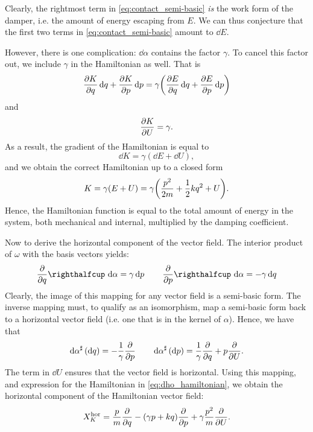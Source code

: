 Clearly, the rightmost term in \cref{eq:contact_semi-basic} \emph{is} the work form of the damper, i.e. the amount of energy escaping from $E$. We can thus conjecture that the first two terms in \cref{eq:contact_semi-basic} amount to $\dd{E}$.

However, there is one complication: $\dd{\alpha}$ contains the factor $\gamma$. To cancel this factor out, we include $\gamma$ in the Hamiltonian as well. That is
$$ 
    \pdv{K}{q}\dd{q} + \pdv{K}{p}\dd{p} = \gamma \qty(\pdv{E}{q}\dd{q} + \pdv{E}{p}\dd{p}) $$
and 
$$ \pdv{K}{U} = \gamma. $$
As a result, the gradient of the Hamiltonian is equal to 
$$ \dd{K} = \gamma (\dd{E} + \dd{U}), $$
and we obtain the correct Hamiltonian up to a closed form
\begin{equation} 
    K = \gamma (E + U) = \gamma\qty( \frac{p^2}{2m} + \frac{1}{2}kq^2 + U). 
    \label{eq:dho_hamiltonian}
\end{equation} 
Hence, the Hamiltonian function is equal to the total amount of energy in the system, both mechanical and internal, multiplied by the damping coefficient.

Now to derive the horizontal component of the vector field. The interior product of $\omega$ with the basis vectors yields:
\begin{equation}
    \intpr{\pdv{}{q}}{\dd{\alpha}} = \gamma \dd{p} \qquad \intpr{\pdv{}{p}}{\dd{\alpha}} = -\gamma \dd{q}
\end{equation}
Clearly, the image of this mapping for any vector field is a semi-basic form. The inverse mapping must, to qualify as an isomorphism, map a semi-basic form back to a horizontal vector field (i.e. one that is in the kernel of $\alpha$). Hence, we have that
\begin{equation} 
    \dd{\alpha}^\sharp\qty(\dd{q}) = -\frac{1}{\gamma} \pdv{}{p} \qquad 
    \dd{\alpha}^\sharp\qty(\dd{p}) = \frac{1}{\gamma}\pdv{}{q} +  p \pdv{}{U}. 
\end{equation}
The term in $\dd{U}$ ensures that the vector field is horizontal. Using this mapping, and expression for the Hamiltonian in \cref{eq:dho_hamiltonian}, we obtain the horizontal component of the Hamiltonian vector field:
\begin{equation} 
    X_K^\text{hor} = \frac{p}{m}\pdv{}{q} - (\gamma p + kq)\pdv{}{p} + \gamma \frac{p^2}{m} \pdv{}{U}.
    \label{eq:dho_horizontal}
\end{equation}

